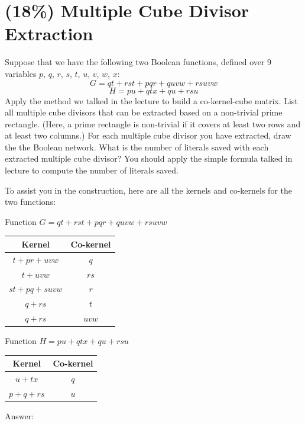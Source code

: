 \documentclass[12pt]{article}
\begin{document}
\section{(18\%) Multiple Cube Divisor Extraction}
Suppose that we have the following two Boolean functions,
defined over 9 variables $p$, $q$, $r$, $s$, $t$, $u$, $v$, $w$, $x$:
\[G=qt+rst+pqr+quvw+rsuvw\]
\[H=pu+qtx+qu+rsu\]
Apply the method we talked in the lecture to build a co-kernel-cube matrix.
List all multiple cube divisors that can be extracted based on a non-trivial prime rectangle.
(Here, a prime rectangle is non-trivial if it covers at least two rows and at least two columns.)
For each multiple cube divisor you have extracted,
draw the the Boolean network.
What is the number of literals saved with each extracted multiple cube divisor?
You should apply the simple formula talked in lecture to compute the number of literals saved.

To assist you in the construction,
here are all the kernels and co-kernels for the two functions:

Function $G=qt+rst+pqr+quvw+rsuvw$
\begin{center}
    \tabcolsep=8pt
    \begin{tabular}{|c|c|}
        \hline
        Kernel & Co-kernel \\
        \hline
        $t+pr+uvw$   & $q$   \\
        $t+uvw$      & $rs$  \\
        $st+pq+suvw$ & $r$   \\
        $q+rs$       & $t$   \\
        $q+rs$       & $uvw$ \\
        \hline
    \end{tabular}
\end{center}

Function $H=pu+qtx+qu+rsu$
\begin{center}
    \tabcolsep=8pt
    \begin{tabular}{|c|c|}
        \hline
        Kernel & Co-kernel \\
        \hline
        $u+tx$       & $q$   \\
        $p+q+rs$     & $u$   \\
        \hline
    \end{tabular}
\end{center}

Answer:
\end{document}
